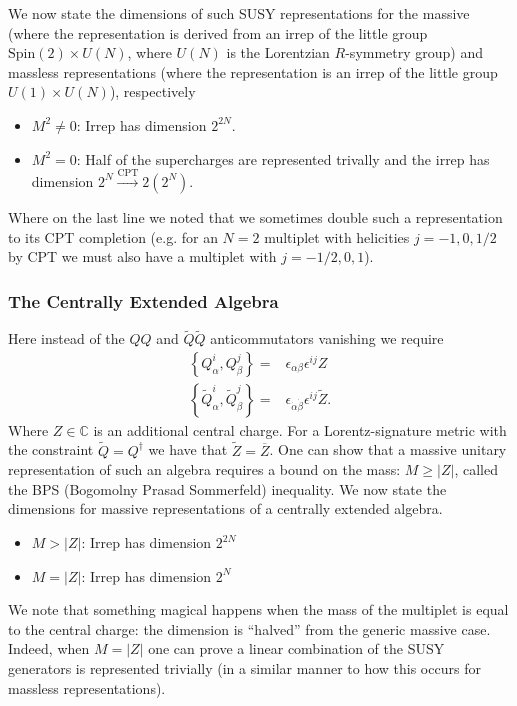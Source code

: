 \documentclass[12pt, onecolumn]{article}
\begin{document}
\vspace{5mm}

\noindent We now state the dimensions of such SUSY representations for the massive (where the representation is derived from an irrep of the little group $\text{Spin}(2) \times U(N)$, where $U(N)$ is the Lorentzian $R$-symmetry group) and massless representations (where the representation is an irrep of the little group $U(1) \times U(N)$), respectively
\begin{itemize}
\item \underline{$M^2 \neq 0$}: Irrep has dimension $2^{2N}$.
\item \underline{$M^2=0$}: Half of the supercharges are represented trivally and the irrep has dimension $2^{N} \overset{\text{CPT}}{\longrightarrow} 2(2^{N})$.
\end{itemize}
Where on the last line we noted that we sometimes double such a representation to its CPT completion (e.g. for an $N=2$ multiplet with helicities $j=-1,0,1/2$ by CPT we must also have a multiplet with $j=-1/2,0,1$).

\subsubsection{The Centrally Extended Algebra}
Here instead of the $QQ$ and $\widetilde{Q}\widetilde{Q}$ anticommutators vanishing we require
\begin{align*}
\left \{Q_{\alpha}^{i},Q_{\beta}^{j} \right\}=&\epsilon_{\alpha \beta}\epsilon^{ij}Z\\
\left \{\widetilde{Q}_{\alpha}^{i},\widetilde{Q}_{\beta}^{j} \right\}=&\epsilon_{\dot{\alpha}\dot{\beta}}\epsilon^{ij}\widetilde{Z}.
\end{align*}
Where $Z \in \mathbb{C}$ is an additional central charge.  For a Lorentz-signature metric with the constraint $\widetilde{Q}=Q^{\dagger}$ we have that $\widetilde{Z}=\overline{Z}$.  One can show that a massive unitary representation of such an algebra requires a bound on the mass: $M \geq |Z|$, called the BPS (Bogomolny Prasad Sommerfeld) inequality. We now state the dimensions for massive representations of a centrally extended algebra.
\begin{itemize}
\item $M>|Z|$: Irrep has dimension $2^{2N}$
\item $M=|Z|$: Irrep has dimension $2^{N}$
\end{itemize}
We note that something magical happens when the mass of the multiplet is equal to the central charge: the dimension is ``halved'' from the generic massive case. Indeed, when $M=|Z|$ one can prove a linear combination of the SUSY generators is represented trivially (in a similar manner to how this occurs for massless representations).
\end{document}
